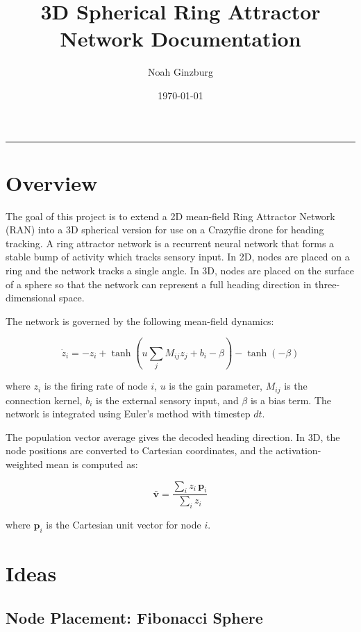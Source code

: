 \documentclass[12pt, letterpaper]{article}
\title{3D Spherical Ring Attractor Network Documentation}
\author{Noah Ginzburg}
\date{\today}
\begin{document}
\maketitle
\rule{0.95\textwidth}{0.5pt}

\tableofcontents
\newpage

\section{Overview}

The goal of this project is to extend a 2D mean-field Ring Attractor Network (RAN) into a 3D spherical version for use on a Crazyflie drone for heading tracking. A ring attractor network is a recurrent neural network that forms a stable bump of activity which tracks sensory input. In 2D, nodes are placed on a ring and the network tracks a single angle. In 3D, nodes are placed on the surface of a sphere so that the network can represent a full heading direction in three-dimensional space.

The network is governed by the following mean-field dynamics:

\begin{equation}
    \dot{z}_i = -z_i + \tanh\left(u \sum_j M_{ij} z_j + b_i - \beta\right) - \tanh(-\beta)
\end{equation}

where $z_i$ is the firing rate of node $i$, $u$ is the gain parameter, $M_{ij}$ is the connection kernel, $b_i$ is the external sensory input, and $\beta$ is a bias term. The network is integrated using Euler's method with timestep $dt$.

The population vector average gives the decoded heading direction. In 3D, the node positions are converted to Cartesian coordinates, and the activation-weighted mean is computed as:

\begin{equation}
    \bar{\mathbf{v}} = \frac{\sum_i z_i \, \mathbf{p}_i}{\sum_i z_i}
\end{equation}

where $\mathbf{p}_i$ is the Cartesian unit vector for node $i$.

\section{Ideas}

\subsection{Node Placement: Fibonacci Sphere}
\end{document}

